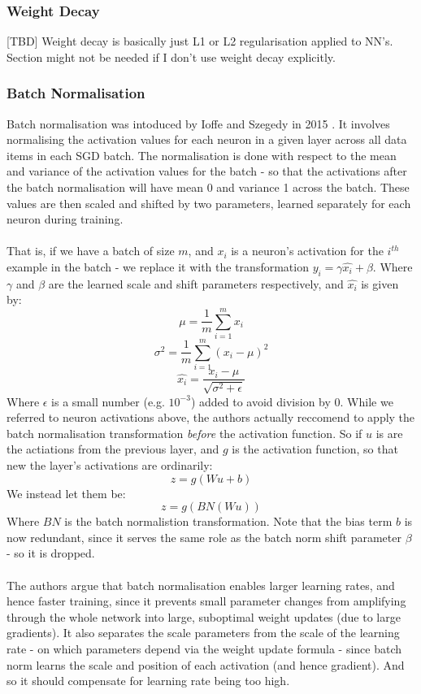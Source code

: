\documentclass[11pt]{article} %
\theoremstyle{plain}
\theoremstyle{definition}
\begin{document}
\subsubsection{Weight Decay}
[TBD] Weight decay is basically just L1 or L2 regularisation applied to NN's. Section might not be needed if I don't use weight decay explicitly.

\subsubsection{Batch Normalisation}
Batch normalisation was intoduced by Ioffe and Szegedy in 2015 \cite{BatchNorm_Paper}. It involves normalising the activation values for each neuron in a given layer across all data items in each SGD batch. The normalisation is done with respect to the mean and variance of the activation values for the batch - so that the activations after the batch normalisation will have mean 0 and variance 1 across the batch. These values are then scaled and shifted by two parameters, learned separately for each neuron during training. 
\\
\\
\noindent
That is, if we have a batch of size \(m\), and \(x_i\) is a neuron's activation for the \(i^{th}\) example in the batch - we replace it with the transformation \(y_i = \gamma \hat{x_i} + \beta\). Where \(\gamma\) and \(\beta\) are the learned scale and shift parameters respectively, and \(\hat{x_i}\) is given by: 
\[ \mu = \dfrac{1}{m} \sum_{i=1}^m x_i \]
\[ \sigma^2 = \dfrac{1}{m} \sum_{i=1}^m (x_i - \mu)^2 \]
\[ \hat{x_i} = \dfrac{x_i - \mu}{\sqrt{\sigma^2 + \epsilon}} \]
\noindent
Where \(\epsilon\) is a small number (e.g. \(10^{-3}\)) added to avoid division by 0. While we referred to neuron activations above, the authors actually reccomend to apply the batch normalisation transformation \textit{before} the activation function. So if \(u\) is are the actiations from the previous layer, and \(g\) is the activation function, so that new the layer's activations are ordinarily:
\[ z = g(Wu + b) \]
We instead let them be:
\[ z = g(BN(Wu)) \]
Where \(BN\) is the batch normalistion transformation. Note that the bias term \(b\) is now redundant, since it serves the same role as the batch norm shift parameter \(\beta\) - so it is dropped.
\\
\\
\noindent
The authors argue that batch normalisation enables larger learning rates, and hence faster training, since it prevents small parameter changes from amplifying through the whole network into large, suboptimal weight updates (due to large gradients). It also separates the scale parameters from the scale of the learning rate - on which parameters depend via the weight update formula - since batch norm learns the scale and position of each activation (and hence gradient). And so it should compensate for learning rate being too high. 
\end{document}
